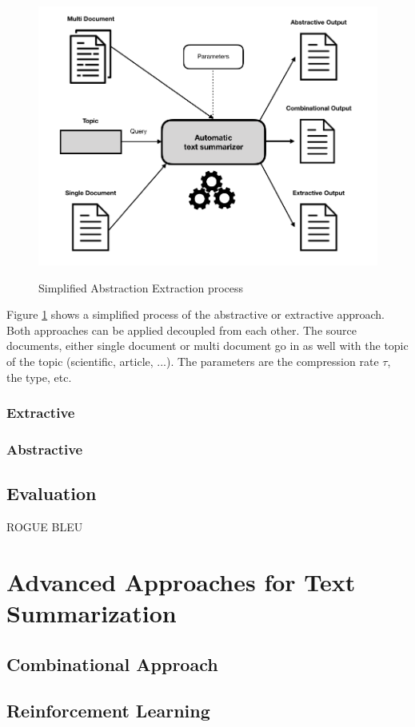 \begin{figure}
	\begin{center}
		\includegraphics[width=5in]{photos/abex}\\
		\caption{Simplified Abstraction Extraction process}\label{abex}
	\end{center}
\end{figure}	

Figure \ref{abex} shows a simplified process of the abstractive or extractive approach. Both approaches can be applied decoupled from each other. The source documents, either single document or multi document go in as well with the topic of the topic (scientific, article, ...). The parameters are the compression rate \(\tau\), the type, etc. 

\subsubsection{Extractive}
\subsubsection{Abstractive}

\subsection{Evaluation}
ROGUE
BLEU


\section{Advanced Approaches for Text Summarization}\label{ss:trends}

\subsection{Combinational Approach}

\subsection{Reinforcement Learning}
